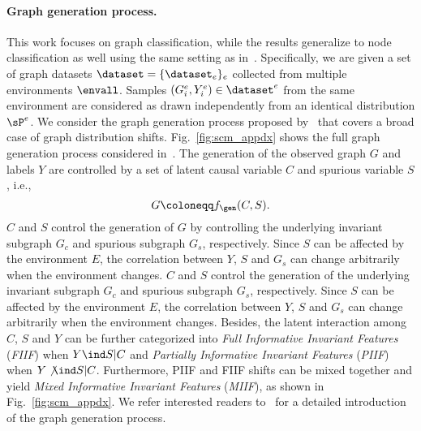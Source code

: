 % 

\paragraph{Graph generation process.}
This work focuses on graph classification, while the results generalize
to node classification as well using the same setting as in~\citet{eerm}.
Specifically,
we are given a set of graph datasets $\dataset=\{\dataset_e\}_e$ collected from multiple environments $\envall$.
Samples $(G^e_i, Y^e_i)\in \dataset^e$ from the same
environment are considered as drawn independently from an identical distribution $\sP^e$.
%
We consider the graph generation process proposed
by~\citet{ciga} that covers a broad case of graph distribution shifts.
%
Fig.~\ref{fig:scm_appdx} shows the full graph generation process considered in~\citet{ciga}.
%
The generation of the observed graph $G$ and labels $Y$
are controlled by a set of latent causal variable $C$ and spurious variable $S$, i.e.,
\[G\coloneqq f_\gen(C,S).\]
$C$ and $S$ control the generation of $G$ by controlling the underlying invariant subgraph $G_c$
and spurious subgraph $G_s$, respectively.
Since $S$ can be affected by the environment $E$,
the correlation between $Y$, $S$ and $G_s$ can change arbitrarily
when the environment changes.
%
$C$ and $S$ control the generation of the underlying invariant subgraph $G_c$
and spurious subgraph $G_s$, respectively.
Since $S$ can be affected by the environment $E$,
the correlation between $Y$, $S$ and $G_s$ can change arbitrarily
when the environment changes.
Besides, the latent interaction among $C$, $S$ and $Y$
can be further categorized into \emph{Full Informative Invariant Features} (\emph{FIIF})
when $Y\ind S|C$ and \emph{Partially Informative Invariant Features} (\emph{PIIF}) when $Y \not\ind S|C$. Furthermore, PIIF and FIIF shifts can be mixed together and yield \emph{Mixed Informative Invariant Features} (\emph{MIIF}), as shown in Fig.~\ref{fig:scm_appdx}.
We refer interested readers to~\citet{ciga} for a detailed introduction of the graph generation process.




